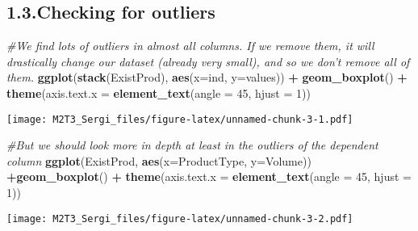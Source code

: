 \documentclass[]{article}
\newenvironment{Shaded}{\begin{snugshade}}{\end{snugshade}}
\newcommand{\CommentTok}[1]{\textcolor[rgb]{0.56,0.35,0.01}{\textit{#1}}}
\newcommand{\DataTypeTok}[1]{\textcolor[rgb]{0.13,0.29,0.53}{#1}}
\newcommand{\DecValTok}[1]{\textcolor[rgb]{0.00,0.00,0.81}{#1}}
\newcommand{\KeywordTok}[1]{\textcolor[rgb]{0.13,0.29,0.53}{\textbf{#1}}}
\newcommand{\NormalTok}[1]{#1}
\newcommand{\OperatorTok}[1]{\textcolor[rgb]{0.81,0.36,0.00}{\textbf{#1}}}
\newcommand{\OtherTok}[1]{\textcolor[rgb]{0.56,0.35,0.01}{#1}}
\newcommand{\StringTok}[1]{\textcolor[rgb]{0.31,0.60,0.02}{#1}}
\begin{document}
\hypertarget{checking-for-outliers}{%
\subsection{1.3.Checking for outliers}\label{checking-for-outliers}}

\begin{Shaded}
\begin{Highlighting}[]
\CommentTok{#We find lots of outliers in almost all columns. If we remove them, it will drastically change our dataset (already very small), and so we don't remove all of them.}
\KeywordTok{ggplot}\NormalTok{(}\KeywordTok{stack}\NormalTok{(ExistProd), }\KeywordTok{aes}\NormalTok{(}\DataTypeTok{x=}\NormalTok{ind, }\DataTypeTok{y=}\NormalTok{values)) }\OperatorTok{+}\StringTok{ }\KeywordTok{geom_boxplot}\NormalTok{() }\OperatorTok{+}\StringTok{ }\KeywordTok{theme}\NormalTok{(}\DataTypeTok{axis.text.x =} \KeywordTok{element_text}\NormalTok{(}\DataTypeTok{angle =} \DecValTok{45}\NormalTok{, }\DataTypeTok{hjust =} \DecValTok{1}\NormalTok{))}
\end{Highlighting}
\end{Shaded}

\texttt{[image: M2T3\_Sergi\_files/figure-latex/unnamed-chunk-3-1.pdf]}

\begin{Shaded}
\begin{Highlighting}[]
\CommentTok{#But we should look more in depth at least in the outliers of the dependent column}
\KeywordTok{ggplot}\NormalTok{(ExistProd, }\KeywordTok{aes}\NormalTok{(}\DataTypeTok{x=}\NormalTok{ProductType, }\DataTypeTok{y=}\NormalTok{Volume)) }\OperatorTok{+}\KeywordTok{geom_boxplot}\NormalTok{() }\OperatorTok{+}\StringTok{ }\KeywordTok{theme}\NormalTok{(}\DataTypeTok{axis.text.x =} \KeywordTok{element_text}\NormalTok{(}\DataTypeTok{angle =} \DecValTok{45}\NormalTok{, }\DataTypeTok{hjust =} \DecValTok{1}\NormalTok{))}
\end{Highlighting}
\end{Shaded}

\texttt{[image: M2T3\_Sergi\_files/figure-latex/unnamed-chunk-3-2.pdf]}

\begin{Shaded}
\end{Shaded}
\end{document}
